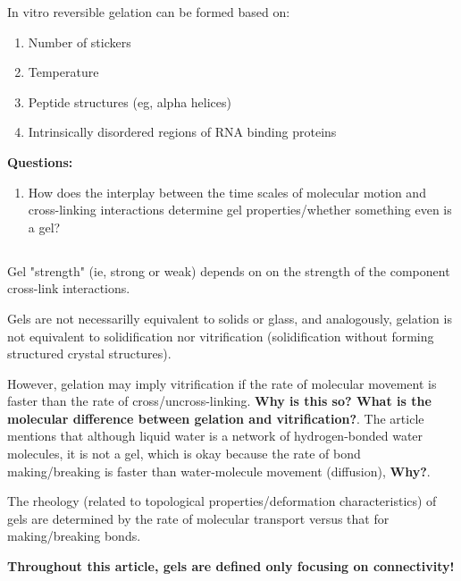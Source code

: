 \documentclass{article}
\begin{document}
In vitro reversible gelation can be formed based on:

\begin{enumerate}
    \item Number of stickers
    \item Temperature
    \item Peptide structures (eg, alpha helices)
    \item Intrinsically disordered regions of RNA binding proteins
\end{enumerate}

\textbf{Questions:}

\begin{enumerate}
    \item How does the interplay between the time scales of molecular motion and cross-linking interactions determine gel properties/whether something even is a gel?
\end{enumerate}

\subsection{}

Gel "strength" (ie, strong or weak) depends on on the strength of the component cross-link interactions.

Gels are not necessarilly equivalent to solids or glass, and analogously, gelation is not equivalent to solidification nor vitrification (solidification without forming structured crystal structures).

However, gelation may imply vitrification if the rate of molecular movement is faster than the rate of cross/uncross-linking. \textbf{Why is this so? What is the molecular difference between gelation and vitrification?}. The article mentions that although liquid water is a network of hydrogen-bonded water molecules, it is not a gel, which is okay because the rate of bond making/breaking is faster than water-molecule movement (diffusion), \textbf{Why?}.

The rheology (related to topological properties/deformation characteristics) of gels are determined by the rate of molecular transport versus that for making/breaking bonds.

\textbf{Throughout this article, gels are defined only focusing on connectivity!}

\subsection{}
\end{document}
